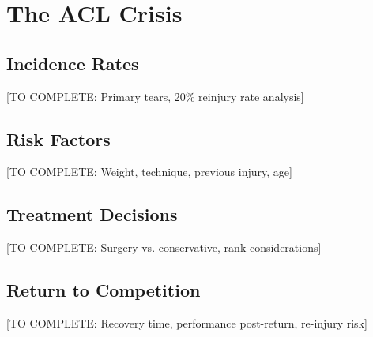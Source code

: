 \section{The ACL Crisis}

\subsection{Incidence Rates}

[TO COMPLETE: Primary tears, 20\% reinjury rate analysis]

\subsection{Risk Factors}

[TO COMPLETE: Weight, technique, previous injury, age]

\subsection{Treatment Decisions}

[TO COMPLETE: Surgery vs. conservative, rank considerations]

\subsection{Return to Competition}

[TO COMPLETE: Recovery time, performance post-return, re-injury risk]